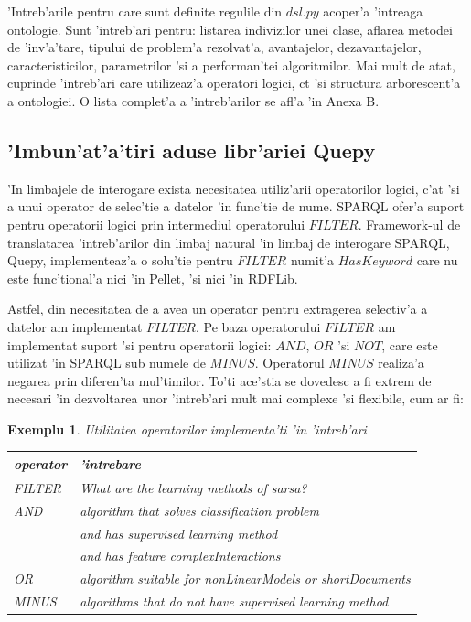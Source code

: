 \documentclass[12pt,a4paper,twoside]{report}
\newtheorem{example}{Exemplu}
\begin{document}
'Intreb'arile pentru care sunt definite regulile din $dsl.py$ acoper'a 'intreaga ontologie. Sunt 'intreb'ari pentru: listarea indivizilor unei clase, aflarea metodei de 'inv'a'tare, tipului de problem'a rezolvat'a, avantajelor, dezavantajelor, caracteristicilor, parametrilor 'si a performan'tei algoritmilor. Mai mult de at\ia at, cuprinde 'intreb'ari care utilizeaz'a operatori logici, c\ia t 'si structura arborescent'a a ontologiei. O lista complet'a a 'intreb'arilor se afl'a 'in Anexa B. 

\subsection{'Imbun'at'a'tiri aduse libr'ariei Quepy}

'In limbajele de interogare exista necesitatea utiliz'arii operatorilor logici, c'at 'si a unui operator de selec'tie a datelor 'in func'tie de nume. SPARQL ofer'a suport pentru operatorii logici prin intermediul operatorului $FILTER$. Framework-ul de translatarea  'intreb'arilor din limbaj natural 'in limbaj de interogare SPARQL, Quepy, implementeaz'a o solu'tie pentru $FILTER$ numit'a $HasKeyword$ care nu este func'tional'a nici 'in Pellet, 'si nici 'in RDFLib. 

Astfel, din necesitatea de a avea un operator pentru extragerea selectiv'a a datelor am implementat $FILTER$. Pe baza operatorului $FILTER$ am implementat suport 'si pentru operatorii logici: $AND$, $OR$ 'si $NOT$, care este utilizat 'in SPARQL sub numele de $MINUS$. Operatorul $MINUS$ realiza'a negarea prin diferen'ta mul'timilor. To'ti ace'stia se dovedesc a fi extrem de necesari 'in dezvoltarea unor 'intreb'ari mult mai complexe 'si flexibile, cum ar fi:


  
  \begin{example} Utilitatea operatorilor implementa'ti 'in 'intreb'ari
  
 \begin{center}
      \begin{tabular}{ll}
      operator & 'intrebare\\ \hline
      
  {\it FILTER } & What are the learning methods of sarsa?\\
  {\it AND} & algorithm that solves classification problem \\
            & and has supervised learning method \\
            & and has feature complexInteractions \\
  {\it OR } & algorithm suitable for nonLinearModels or shortDocuments\\
  {\it MINUS} & algorithms that do not have supervised learning method\\
       \end{tabular}
       \end{center}
        \vspace{0.3cm}
   \end{example}
\end{document}
